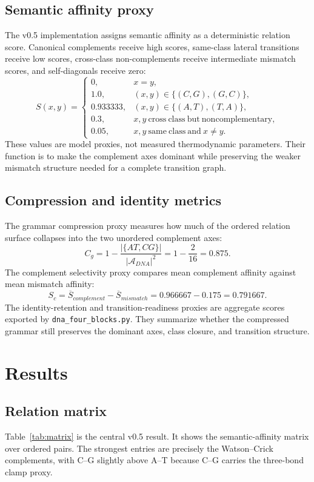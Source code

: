 \documentclass[11pt]{article}
\begin{document}
\subsection{Semantic affinity proxy}
The v0.5 implementation assigns semantic affinity as a deterministic relation score. Canonical complements receive high scores, same-class lateral transitions receive low scores, cross-class non-complements receive intermediate mismatch scores, and self-diagonals receive zero:
\[
S(x,y)=
\begin{cases}
0, & x=y,\\
1.0, & (x,y)\in\{(C,G),(G,C)\},\\
0.933333, & (x,y)\in\{(A,T),(T,A)\},\\
0.3, & x,y\ \mathrm{cross\ class\ but\ noncomplementary},\\
0.05, & x,y\ \mathrm{same\ class\ and}\ x\ne y.
\end{cases}
\]
These values are model proxies, not measured thermodynamic parameters. Their function is to make the complement axes dominant while preserving the weaker mismatch structure needed for a complete transition graph.

\subsection{Compression and identity metrics}
The grammar compression proxy measures how much of the ordered relation surface collapses into the two unordered complement axes:
\[
  C_g = 1 - \frac{|\{A\!T,C\!G\}|}{|\mathcal{A}_{DNA}|^2}=1-\frac{2}{16}=0.875.
\]
The complement selectivity proxy compares mean complement affinity against mean mismatch affinity:
\[
  S_c = \overline{S}_{complement} - \overline{S}_{mismatch}=0.966667-0.175=0.791667.
\]
The identity-retention and transition-readiness proxies are aggregate scores exported by \texttt{dna\_four\_blocks.py}. They summarize whether the compressed grammar still preserves the dominant axes, class closure, and transition structure.

\section{Results}
\subsection{Relation matrix}
Table~\ref{tab:matrix} is the central v0.5 result. It shows the semantic-affinity matrix over ordered pairs. The strongest entries are precisely the Watson--Crick complements, with C--G slightly above A--T because C--G carries the three-bond clamp proxy.
\end{document}
